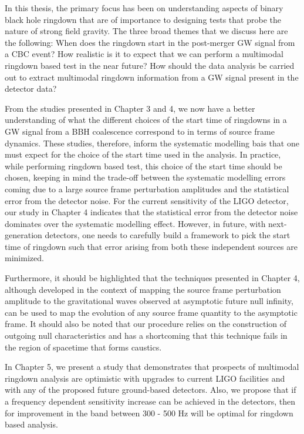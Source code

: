 In this thesis, the primary focus has been on understanding aspects of binary black hole ringdown that are of importance to designing tests that probe the nature of strong field gravity.  The three broad themes that we discuss here are the following: When does the ringdown start in the post-merger GW signal from a CBC event? How realistic is it to expect that we can perform a multimodal ringdown based test in the near future? How should the data analysis be carried out to extract multimodal ringdown information from a GW signal present in the detector data?

From the studies presented in  Chapter 3 and 4, we now have a better understanding of what the different choices of the start time of ringdowns in a GW signal from a BBH coalescence correspond to in terms of source frame dynamics. These studies, therefore, inform the systematic modelling bais that one must expect for the choice of the start time used in the analysis. In practice, while performing ringdown based test, this choice of the start time should be chosen, keeping in mind the trade-off between the systematic modelling errors coming due to a large source frame perturbation amplitudes and the statistical error from the detector noise. For the current sensitivity of the LIGO detector, our study in Chapter 4 indicates that the statistical error from the detector noise dominates over the systematic modelling effect. However, in future, with next-generation detectors, one needs to carefully build a framework to pick the start time of ringdown such that error arising from both these independent sources are minimized.  

Furthermore, it should be highlighted that the techniques presented in Chapter 4, although developed in the context of mapping the source frame perturbation amplitude to the gravitational waves observed at asymptotic future null infinity,  can be used to map the evolution of any source frame quantity to the asymptotic frame. It should also be noted that our procedure relies on the construction of outgoing null characteristics and has a shortcoming that this technique fails in the region of spacetime that forms caustics.  

In Chapter 5, we present a study that demonstrates that prospects of multimodal ringdown analysis are optimistic with upgrades to current LIGO facilities and with any of the proposed future ground-based detectors. Also, we propose that if a frequency dependent sensitivity increase can be achieved in the detectors, then for improvement in the band between 300 - 500 Hz will be optimal for ringdown based analysis.  

